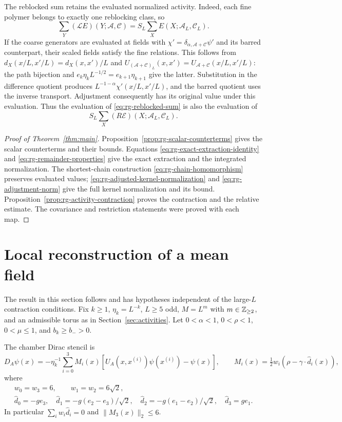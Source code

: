 The reblocked sum retains the evaluated normalized
activity. Indeed, each fine polymer belongs to exactly
one reblocking class, so
\begin{equation}\label{eq:rg-reblocked-sum}
 \sum_Y(\mathcal LE)(Y;\mathscr A,\mathscr C)
      =S_L\sum_X E(X;\mathscr A_L,\mathscr C_L).
\end{equation}
If the coarse generators are evaluated at fields
with $\chi'=\delta_{\alpha,\mathscr A+\mathscr C}\psi'$
and its barred counterpart, their scaled fields satisfy
the fine relations. This follows from
$d_X(x/L,x'/L)=d_X(x,x')/L$ and
$U_{(\mathscr A+\mathscr C)_L}(x,x')
 =U_{\mathscr A+\mathscr C}(x/L,x'/L)$:
the path bijection and
$e_k\eta_kL^{-1/2}=e_{k+1}\eta_{k+1}$ give the latter.
Substitution in the difference quotient produces
$L^{-1-\alpha}\chi'(x/L,x'/L)$, and the barred quotient
uses the inverse transport. Adjustment consequently
has its original value under this evaluation. Thus the
evaluation of \eqref{eq:rg-reblocked-sum} is also the
evaluation of
\[
 S_L\sum_X(R\mathscr E)(X;\mathscr A_L,\mathscr C_L).
\]
\begin{proof}[Proof of Theorem~\ref{thm:main}]
Proposition~\ref{prop:rg-scalar-counterterms} gives the scalar
counterterms and their bounds. Equations
\eqref{eq:rg-exact-extraction-identity} and
\eqref{eq:rg-remainder-properties} give the exact extraction and
the integrated normalization. The shortest-chain construction
\eqref{eq:rg-chain-homomorphism} preserves evaluated values;
\eqref{eq:rg-adjusted-kernel-normalization} and
\eqref{eq:rg-adjustment-norm} give the full kernel normalization
and its bound. Proposition~\ref{prop:rg-activity-contraction}
proves the contraction and the relative estimate. The covariance
and restriction statements were proved with each map.
\end{proof}
\section{Local reconstruction of a mean field}
\label{subsec:rg-field-reconstruction}

The result in this section follows
\cite[\S\S12.4,13.4]{QED3Manuscript} and has hypotheses independent
of the large-\(L\) contraction conditions. Fix \(k\ge1\),
\(\eta_k=L^{-k}\), \(L\ge5\) odd, \(M=L^m\) with \(m\in\mathbb Z_{\ge2}\),
and an admissible torus as in Section~\ref{sec:activities}.
Let \(0<\alpha<1\), \(0<\rho<1\), \(0<\mu\le1\), and
\(b_k\ge b_->0\).

The chamber Dirac stencil is
\[
 D_A\psi(x)=-\eta_k^{-1}\sum_{i=0}^3M_i(x)
            [U_A(x,x^{(i)})\psi(x^{(i)})-\psi(x)],
 \qquad
 M_i(x)=\tfrac12w_i(\rho-\gamma\cdot\widehat d_i(x)),
\]
where
\[
 \begin{gathered}
 w_0=w_3=6,\qquad w_1=w_2=6\sqrt2,\\
 \widehat d_0=-ge_3,\quad
 \widehat d_1=-g(e_2-e_3)/\sqrt2,\quad
 \widehat d_2=-g(e_1-e_2)/\sqrt2,\quad
 \widehat d_3=ge_1 .
 \end{gathered}
\]
In particular
\(\sum_iw_i\widehat d_i=0\) and \(\|M_3(x)\|_2\le6\).

